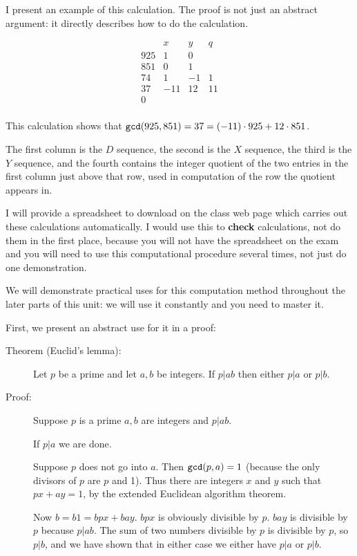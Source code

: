 \documentclass[12pt]{article}
\begin{document}
I present an example of this calculation.  The proof is not just an abstract argument:  it directly describes how to do the calculation.

$$\begin{array}{cccc}

 & x & y & q \\ \hline

925 & 1 & 0 & \\

851 & 0 & 1 & \\

 74 & 1 & -1 & 1 \\

 37 & -11 & 12 & 11\\

0 & & & \\

\end{array}$$

This calculation shows that ${\tt gcd}(925,851) = 37 = (-11)\cdot 925 + 12\cdot 851$.

The first column is the $D$ sequence, the second is the $X$ sequence, the third is the $Y$ sequence,
and the fourth contains the integer quotient of the two entries in the first column just above that row, used in computation of the row the quotient appears in.

I will provide a spreadsheet to download on the class web page which carries out these calculations automatically.  I would use this to {\bf check} calculations, not do them in the first place, because you will not have the spreadsheet on the exam and you will need to use this computational procedure several times, not just do one demonstration.

We will demonstrate practical uses for this computation method throughout the later parts of this unit:  we will use it constantly and you need to master it.

First, we present an abstract use for it in a proof:

\begin{description}

\item[Theorem (Euclid's lemma):]  Let $p$ be a prime and let $a,b$ be integers.  If $p|ab$ then either $p|a$ or $p|b$.



\item[Proof:]  Suppose $p$ is a prime $a,b$ are integers and $p|ab$.

If $p|a$ we are done.

Suppose $p$ does not go into $a$.  Then ${\tt gcd}(p,a) =1$ (because the only divisors of $p$ are $p$ and 1).
Thus there are integers $x$ and $y$ such that $px+ay = 1$, by the extended Euclidean algorithm theorem.

Now $b = b1 = bpx + bay$.  $bpx$ is obviously divisible by $p$.  $bay$ is divisible by $p$ because $p|ab$.
The sum of two numbers divisible by $p$ is divisible by $p$, so $p|b$, and we have shown that in either  case we either have $p|a$ or $p|b$.

\end{description}
\end{document}

